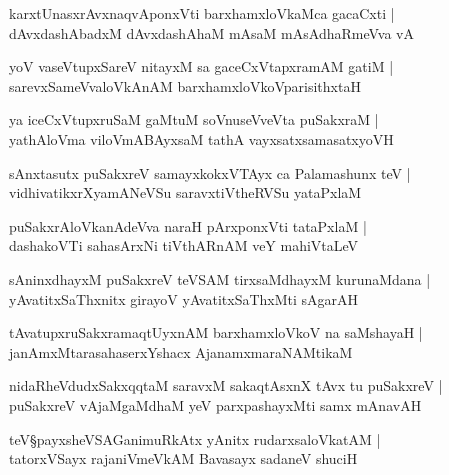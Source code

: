 \begin{shloka}
karxtUnasxrAvxnaqvAponxVti barxhamxloVkaMca gacaCxti |\\
dAvxdashAbadxM dAvxdashAhaM mAsaM mAsAdhaRmeVva vA
\end{shloka}

\begin{shloka}
yoV vaseVtupxSareV nitayxM sa gaceCxVtapxramAM gatiM |\\
sarevxSameVvaloVkAnAM barxhamxloVkoVparisithxtaH
\end{shloka}

\begin{shloka}
ya iceCxVtupxruSaM gaMtuM soVnuseVveVta puSakxraM |\\
yathAloVma viloVmABAyxsaM tathA vayxsatxsamasatxyoVH 
\end{shloka}

\begin{shloka}
sAnxtasutx puSakxreV samayxkokxVTAyx ca Palamashunx teV |\\
vidhivatikxrXyamANeVSu saravxtiVtheRVSu yataPxlaM 
\end{shloka}

\begin{shloka}
puSakxrAloVkanAdeVva naraH pArxponxVti tataPxlaM |\\
dashakoVTi sahasArxNi tiVthARnAM veY mahiVtaLeV 
\end{shloka}

\begin{shloka}
sAninxdhayxM puSakxreV teVSAM tirxsaMdhayxM kurunaMdana |\\
yAvatitxSaThxnitx girayoV yAvatitxSaThxMti sAgarAH
\end{shloka}

\begin{shloka}
tAvatupxruSakxramaqtUyxnAM barxhamxloVkoV na saMshayaH |\\
janAmxMtarasahaserxYshacx AjanamxmaraNAMtikaM 
\end{shloka}

\begin{shloka}
nidaRheVdudxSakxqqtaM saravxM sakaqtAsxnX tAvx tu puSakxreV |\\
puSakxreV vAjaMgaMdhaM yeV parxpashayxMti samx mAnavAH
\end{shloka}

\begin{shloka}
teV\S payxsheVSAGanimuRkAtx yAnitx rudarxsaloVkatAM |\\
tatorxVSayx rajaniVmeVkAM Bavasayx sadaneV shuciH
\end{shloka}

